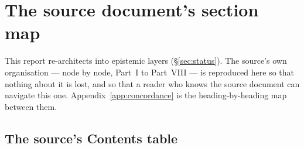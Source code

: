 
\section{The source document's section map}
\label{app:sectionmap}

This report re-architects  into epistemic layers
(\S\ref{sec:status}). The source's own organisation --- node by node, Part~I to
Part~VIII --- is reproduced here so that nothing about it is lost, and so that a
reader who knows the source document can navigate this one.
Appendix~\ref{app:concordance} is the heading-by-heading map between them.

\subsection{The source's Contents table}

